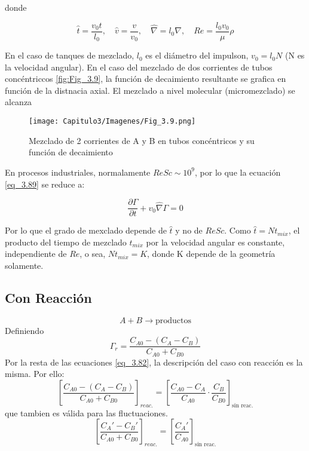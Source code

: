 donde 

\begin{equation}
      \hat{t}=\frac{v_0t}{l_0}, \quad 
      \hat{v}=\frac{v}{v_0},\quad
      \hat{\nabla}=l_0\nabla, \quad
       Re=\frac{l_0v_0}{\mu}\rho 
\end{equation}

En el caso de tanques de mezclado, $l_0$ es el diámetro del impulson, $v_0=l_0N$ (N es la velocidad angular). En el caso del mezclado de dos corrientes de tubos concéntriccos \eqref{fig:Fig_3.9}, la función de decaimiento resultante se grafica en función de la distnacia axial. El mezclado a nivel molecular (micromezclado) se alcanza

\begin{figure}[h]

        \texttt{[image: Capitulo3/Imagenes/Fig\_3.9.png]}
        \caption{Mezclado de 2 corrientes de A y B en tubos concéntricos y su función de decaimiento}
        \label{fig:Fig_3.9}

\end{figure}

En procesos industriales, normalamente $ReSc\sim10^9$, por lo que la ecuación \eqref{eq_3.89} se reduce a:


\begin{equation}
    \frac{\partial\Gamma}{\partial t} + v_0\hat{\nabla}\Gamma = 0
\end{equation}


Por lo que el grado de mexclado depende de $\hat{t}$ y no de $ReSc$. Como $\hat{t}=Nt_{mix}$, el producto del tiempo de mezclado $t_{mix}$ por la velocidad angular es constante, independiente de $Re$, o sea, $Nt_{mix}=K$, donde K depende de la geometría solamente.

\subsection{Con Reacción}
\begin{equation*}
    A + B \rightarrow \text{productos}
\end{equation*}
Definiendo
\begin{equation}
    \Gamma_{r}=\frac{C_{A0}-(C_A-C_B)}{C_{A0}+C_{B0}}
\end{equation}
Por la resta de las ecuaciones \eqref{eq_3.82}, la descripción del caso con reacción es la misma. Por ello:
\begin{equation}
    \left[ \frac{C_{A0}-(C_A-C_B)}{C_{A0}+C_{B0}} \right]_{reac.}=   \left[ \frac{C_{A0}-C_A}{C_{A0}}\cdot\frac{C_B}{C_{B0}} \right]_{\text{sin reac.} }
\end{equation}
que tambien es válida para las fluctuaciones.
\begin{equation}
        \left[ \frac{C_A'-C_B'}{C_{A0}+C_{B0}} \right]_{reac.}=  \left[ \frac{C_A'}{C_{A0}} \right]_{\text{sin reac.} }
\end{equation}

